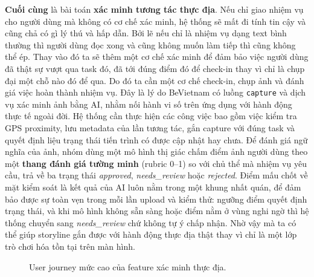 \textbf{Cuối cùng} là bài toán \textbf{xác minh tương tác thực địa}. Nếu chỉ
giao nhiệm vụ cho người dùng mà không có cơ chế xác minh, hệ thống sẽ
mất đi tính tin cậy và cũng chả có gì lý thú và hấp dẫn. Bởi lẽ nếu chỉ
là nhiệm vụ dạng text bình thường thì người dùng đọc xong và cũng không muốn làm tiếp
thì cũng không thể ép. Thay vào đó ta sẽ thêm một cơ chế xác minh để đảm bảo việc người dùng
đã thật sự vượt qua task đó, đã tới đúng điểm đó để check-in thay vì chỉ là chụp đại một chỗ
nào đó để qua. Do đó ta cần một cơ chế check-in, chụp ảnh và đánh
giá việc hoàn thành nhiệm vụ. Đây là lý do BeVietnam có luồng
\texttt{capture} và dịch vụ xác minh ảnh bằng AI, nhằm nối hành vi số
trên ứng dụng với hành động thực tế ngoài đời. Hệ thống cần thực hiện các công việc
bao gồm việc kiểm tra GPS proximity, lưu metadata của lần tương tác,
gắn capture với đúng task và quyết định liệu trạng thái tiến trình có
được cập nhật hay chưa. Để đánh giá ngữ nghĩa của ảnh, nhóm dùng một mô
hình thị giác chấm điểm ảnh người dùng theo một \textbf{thang đánh giá
tường minh} (rubric 0--1) so với chủ thể mà nhiệm vụ yêu cầu, trả về ba
trạng thái \textit{approved}, \textit{needs\_review} hoặc \textit{rejected}.
Điểm mấu chốt về mặt kiểm soát là kết quả của AI luôn nằm trong một
khung nhất quán, để đảm bảo được sự toàn vẹn trong mỗi lần upload và kiểm thử: ngưỡng điểm quyết định trạng thái, và khi mô hình
không sẵn sàng hoặc điểm nằm ở vùng nghi ngờ thì hệ thống chuyển sang
\textit{needs\_review} chứ không tự ý chấp nhận. Nhờ vậy mà ta có thể giúp storyline gắn được với hành động thực địa thật
thay vì chỉ là một lớp trò chơi hóa tồn tại trên màn hình.

\begin{figure}[H]
\centering
{}
\caption{User journey mức cao của feature xác minh thực địa.}
\label{fig:journey_verification}
\end{figure}

